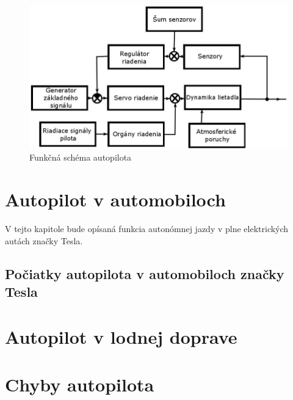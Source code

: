 \documentclass[10pt,twoside,slovak,a4paper]{article}
\begin{document}
\begin{figure}[tbh]
\centering
\includegraphics[scale=0.9]{obr1.jpg}
\caption{Funkčná schéma autopilota}
\label{f:obr1}
\end{figure}

\section{Autopilot v automobiloch}

V tejto kapitole bude opísaná funkcia autonómnej jazdy v plne elektrických autách značky Tesla.

\subsection{Počiatky autopilota v automobiloch značky Tesla}



\section{Autopilot v lodnej doprave} \label{AVLD}
\section{Chyby autopilota} \label{chyby}



 
\end{document}
